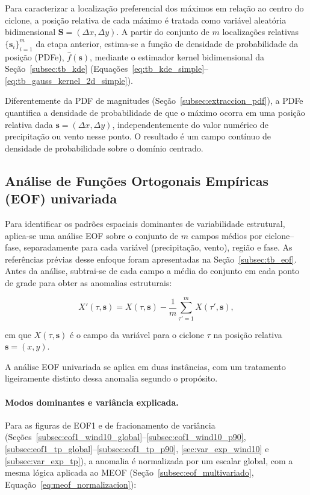 Para caracterizar a localização preferencial dos máximos em relação ao centro do ciclone, a posição relativa de cada máximo é tratada como variável aleatória bidimensional $\mathbf{S} = (\Delta x, \Delta y)$. A partir do conjunto de $m$ localizações relativas $\{\mathbf{s}_i\}_{i=1}^{m}$ da etapa anterior, estima-se a função de densidade de probabilidade da posição (PDFe), $\hat{f}(\mathbf{s})$, mediante o estimador kernel bidimensional da Seção~\ref{subsec:tb_kde} (Equações~\ref{eq:tb_kde_simple}--\ref{eq:tb_gauss_kernel_2d_simple}).

Diferentemente da PDF de magnitudes (Seção~\ref{subsec:extraccion_pdf}), a PDFe quantifica a densidade de probabilidade de que o máximo ocorra em uma posição relativa dada $\mathbf{s} = (\Delta x, \Delta y)$, independentemente do valor numérico de precipitação ou vento nesse ponto. O resultado é um campo contínuo de densidade de probabilidade sobre o domínio centrado.

\subsection{Análise de Funções Ortogonais Empíricas (EOF) univariada}\label{subsec:eof_univariado}

Para identificar os padrões espaciais dominantes de variabilidade estrutural, aplica-se uma análise EOF sobre o conjunto de $m$ campos médios por ciclone--fase, separadamente para cada variável (precipitação, vento), região e fase. As referências prévias desse enfoque foram apresentadas na Seção~\ref{subsec:tb_eof}. Antes da análise, subtrai-se de cada campo a média do conjunto em cada ponto de grade para obter as anomalias estruturais:

\begin{equation}\label{eq:eof_anomalia}
    X'(\tau, \mathbf{s}) = X(\tau, \mathbf{s}) - \frac{1}{m}\sum_{\tau'=1}^{m}X(\tau', \mathbf{s}),
\end{equation}

em que $X(\tau, \mathbf{s})$ é o campo da variável para o ciclone $\tau$ na posição relativa $\mathbf{s} = (x,y)$.

A análise EOF univariada se aplica em duas instâncias, com um tratamento ligeiramente distinto dessa anomalia segundo o propósito.

\paragraph{Modos dominantes e variância explicada.} Para as figuras de EOF1 e de fracionamento de variância (Seções~\ref{subsec:eof1_wind10_global}--\ref{subsec:eof1_wind10_p90}, \ref{subsec:eof1_tp_global}--\ref{subsec:eof1_tp_p90}, \ref{sec:var_exp_wind10} e \ref{subsec:var_exp_tp}), a anomalia é normalizada por um escalar global, com a mesma lógica aplicada ao MEOF (Seção~\ref{subsec:eof_multivariado}, Equação~\ref{eq:meof_normalizacion}):

